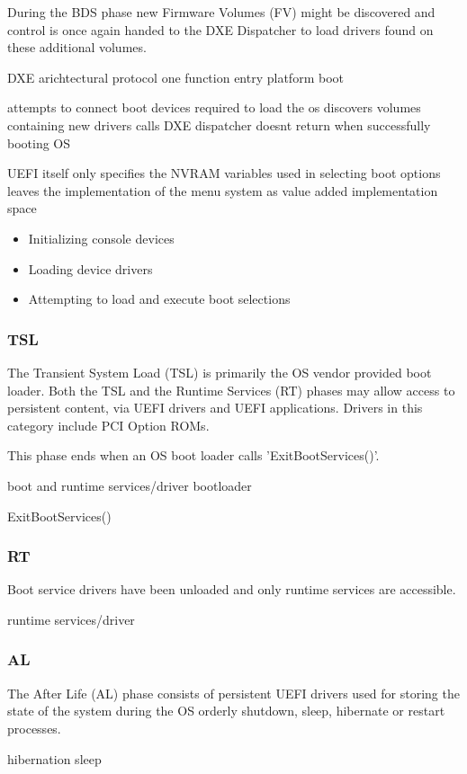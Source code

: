 
During the BDS phase new Firmware Volumes (FV) might be discovered and control is once again handed to the DXE Dispatcher to load drivers found on these additional volumes.


DXE arichtectural protocol
one function entry
platform boot

attempts to connect boot devices required to load the os
discovers volumes containing new drivers
calls DXE dispatcher
doesnt return when successfully booting OS

UEFI itself only specifies the NVRAM variables used in selecting boot options
leaves the implementation of the menu system as value added implementation space \cite{uefi-spec}

\cite{pi-spec}

\begin{itemize}
    \item Initializing console devices
    \item Loading device drivers
    \item Attempting to load and execute boot selections
\end{itemize}

\subsubsection{\acf{TSL}}

The Transient System Load (TSL) is primarily the OS vendor provided boot loader. Both the TSL and the Runtime Services (RT) phases may allow access to persistent content, via UEFI drivers and UEFI applications. Drivers in this category include PCI Option ROMs.

This phase ends when an OS boot loader calls 'ExitBootServices()'.

boot and runtime services/driver
bootloader
\cite[Section 13.3]{uefi-spec}
\cite[Section 3.5.1.1]{uefi-spec}

ExitBootServices()

\subsubsection{\acf{RT}}
Boot service drivers have been unloaded and only runtime services are accessible.


runtime services/driver

\subsubsection{\acf{AL}}
The After Life (AL) phase consists of persistent UEFI drivers used for storing the state of the system during the OS orderly shutdown, sleep, hibernate or restart processes.

hibernation
sleep






